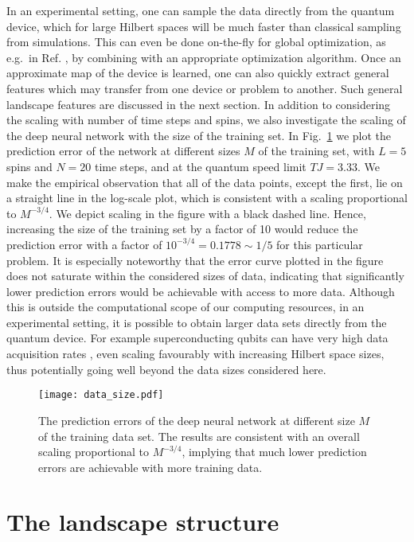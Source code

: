 \documentclass[aps, twocolumn,superscriptaddress]{revtex4-1}
\begin{document}
In an experimental setting, one can sample the data directly from the quantum device, which for large Hilbert spaces will be much faster than classical sampling from simulations. This can even be done on-the-fly for global optimization, as e.g.~in Ref. \cite{kokail2019self}, by combining with an appropriate optimization algorithm. Once an approximate map of the device is learned, one can also quickly extract general features which may transfer from one device or problem to another. Such general landscape features are discussed in the next section.
In addition to considering the scaling with number of time steps and spins, we also investigate the scaling of the deep neural network with the size of the training set. In Fig.~\ref{fig:training_size} we plot the prediction error of the network at different sizes $M$ of the training set, with $L=5$ spins and $N = 20$ time steps, and at the quantum speed limit $TJ = 3.33$. We make the empirical observation that all of the data points, except the first, lie on a straight line in the log-scale plot, which is consistent with a scaling proportional to $M^{-3/4}$. We depict scaling in the figure with a black dashed line. Hence, increasing the size of the training set by a factor of 10 would reduce the prediction error with a factor of $10^{-3/4} = 0.1778 \sim 1/5$ for this particular problem.
It is especially noteworthy that the error curve plotted in the figure does not saturate within the considered sizes of data, indicating that significantly lower prediction errors would be achievable with access to more data. Although this is outside the computational scope of our computing resources, in an experimental setting, it is possible to obtain larger data sets directly from the quantum device. For example superconducting qubits can have very high data acquisition rates \cite{walter2017rapid}, even scaling favourably with increasing Hilbert space sizes, thus potentially going well beyond the data sizes considered here. 


\begin{figure}
    \centering
    \texttt{[image: data\_size.pdf]}
    \caption{The prediction errors of the deep neural network at different size $M$ of the training data set. The results are consistent with an overall scaling proportional to $M^{-3/4}$, implying that much lower prediction errors are achievable with more training data. }
    \label{fig:training_size}
\end{figure}

\section{The landscape structure} \label{sec:landscape_structure}
\end{document}
